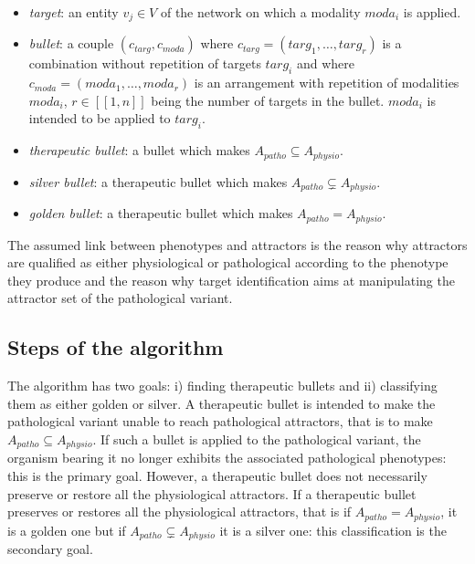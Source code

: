\documentclass[oneside,a4paper,onecolumn,notitlepage,final]{article}
\begin{document}
\begin{itemize}
\item \emph{target}: an entity $v_j\in V$ of the network on which a modality $moda_i$ is applied.
\item \emph{bullet}: a couple $(c_{targ},c_{moda})$ where $c_{targ}=(targ_1,\dots,targ_r)$ is a combination without repetition of targets $targ_i$ and where $c_{moda}=(moda_1,\dots,moda_r)$ is an arrangement with repetition of modalities $moda_i$, $r\in [\![1,n]\!]$ being the number of targets in the bullet. $moda_i$ is intended to be applied to $targ_i$.
\item \emph{therapeutic bullet}: a bullet which makes $A_{patho}\subseteq A_{physio}$.
\item \emph{silver bullet}: a therapeutic bullet which makes $A_{patho}\varsubsetneq A_{physio}$.
\item \emph{golden bullet}: a therapeutic bullet which makes $A_{patho}=A_{physio}$.
\end{itemize}

The assumed link between phenotypes and attractors is the reason why attractors are qualified as either physiological or pathological according to the phenotype they produce and the reason why target identification aims at manipulating the attractor set of the pathological variant.

\subsection{Steps of the algorithm}
The algorithm has two goals: i) finding therapeutic bullets and ii) classifying them as either golden or silver. A therapeutic bullet is intended to make the pathological variant unable to reach pathological attractors, that is to make $A_{patho}\subseteq A_{physio}$. If such a bullet is applied to the pathological variant, the organism bearing it no longer exhibits the associated pathological phenotypes: this is the primary goal. However, a therapeutic bullet does not necessarily preserve or restore all the physiological attractors. If a therapeutic bullet preserves or restores all the physiological attractors, that is if $A_{patho}=A_{physio}$, it is a golden one but if $A_{patho}\varsubsetneq A_{physio}$ it is a silver one: this classification is the secondary goal.
\end{document}
